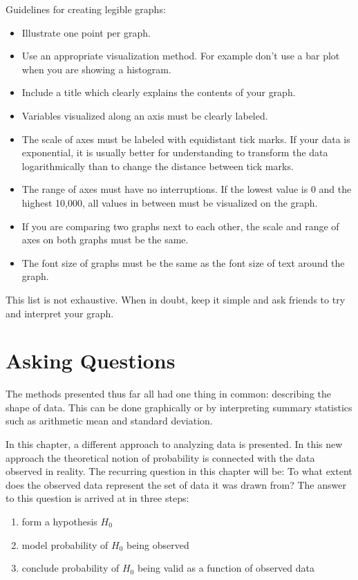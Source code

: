 \documentclass{tufte-book} %
\begin{document}
\begin{tcolorbox}
	Guidelines for creating legible graphs:
	\begin{itemize}
		\item Illustrate one point per graph.
		\item Use an appropriate visualization method. For example don't use a bar plot when you are showing a histogram.
		\item Include a title which clearly explains the contents of your graph.
		\item Variables visualized along an axis must be clearly labeled.
		\item The scale of axes must be labeled with equidistant tick marks. If your data is exponential, it is usually better for understanding to transform the data logarithmically than to change the distance between tick marks.
		\item The range of axes must have no interruptions. If the lowest value is 0 and the highest 10,000, all values in between must be visualized on the graph.
		\item If you are comparing two graphs next to each other, the scale and range of axes on both graphs must be the same.
		\item The font size of graphs must be the same as the font size of text around the graph.
	\end{itemize}
	
	This list is not exhaustive. When in doubt, keep it simple and ask friends to try and interpret your graph.
\end{tcolorbox}
\chapter{Asking Questions}
The methods presented thus far all had one thing in common: describing the shape of data. This can be done graphically or by interpreting summary statistics such as arithmetic mean and standard deviation.

In this chapter, a different approach to analyzing data is presented. In this new approach the theoretical notion of probability is connected with the data observed in reality. The recurring question in this chapter will be: To what extent does the observed data represent the set of data it was drawn from? The answer to this question is arrived at in three steps:

\begin{enumerate}
	\item form a hypothesis $H_0$
	\item model probability of $H_0$ being observed
	\item conclude probability of $H_0$ being valid as a function of observed data
\end{enumerate}
\end{document}

